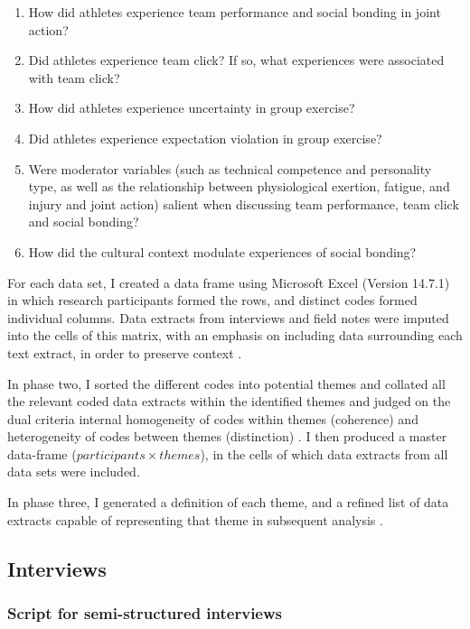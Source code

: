 \begin{CJK}{UTF8}{gbsn}
\begin{enumerate}
  \item How did athletes experience team performance and social bonding in joint action?
  \item Did athletes experience team click? If so, what experiences were associated with team click?
  \item How did athletes experience uncertainty in group exercise?
  \item Did athletes experience expectation violation in group exercise?
  \item Were moderator variables (such as technical competence and personality type, as well as the relationship between physiological exertion, fatigue, and injury and joint action) salient when discussing team performance, team click and social bonding?
  \item How did the cultural context modulate experiences of social bonding?
\end{enumerate}

For each data set, I created a data frame using Microsoft Excel (Version 14.7.1) in which research participants formed the rows, and distinct codes formed individual columns. Data extracts from interviews and field notes were imputed into the cells of this matrix, with an emphasis on including data surrounding each text extract, in order to preserve context \citep[see][]{Bryman2001}.

In phase two, I sorted the different codes into potential themes and collated all the relevant coded data extracts within the identified themes and judged on the dual criteria internal homogeneity of codes within themes (coherence) and heterogeneity of codes between themes (distinction) \citep{Patton1990}.  I then produced a master data-frame ($ participants \times themes$), in the cells of which data extracts from all data sets were included.

In phase three, I generated a definition of each theme, and a refined list of data extracts capable of representing that theme in subsequent analysis \citep{Braun2006}.



\subsection{Interviews}
  \subsubsection{Script for semi-structured interviews \label{sect:semiStructured}}



\end{CJK}
